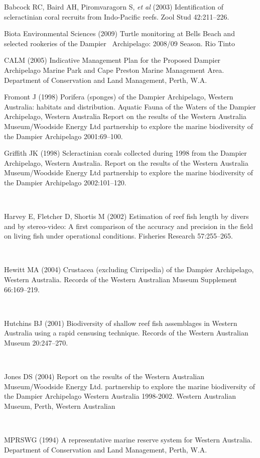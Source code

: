 \documentclass[version=last,
    paper=a4,                               %
    10pt,                                   %
    dvipsnames,
    oneside,                              %
    headings=openany,                       %
    open=any,
    BCOR=7mm,                               %
    DIV=15,     %
]{scrbook}
\begin{document}
Babcock RC, Baird AH, Piromvaragorn S, \emph{et al} (2003)
Identification of scleractinian coral recruits from Indo-Pacific reefs.
Zool Stud 42:211--226.

Biota Environmental Sciences (2009) Turtle monitoring at Bells Beach and
selected rookeries of the Dampier~ Archipelago: 2008/09 Season. Rio
Tinto

CALM (2005) Indicative Management Plan for the Proposed Dampier
Archipelago Marine Park and Cape Preston Marine Management Area.
Department of Conservation and Land Management, Perth, W.A.

Fromont J (1998) Porifera (sponges) of the Dampier Archipelago, Western
Australia: habitats and distribution. Aquatic Fauna of the Waters of the
Dampier Archipelago, Western Australia Report on the results of the
Western Australia Museum/Woodside Energy Ltd partnership to explore the
marine biodiversity of the Dampier Archipelago 2001:69--100.

Griffith JK (1998) Scleractinian corals collected during 1998 from the
Dampier Archipelago, Western Australia. Report on the results of the
Western Australia Museum/Woodside Energy Ltd partnership to explore the
marine biodiversity of the Dampier Archipelago 2002:101--120.

~

Harvey E, Fletcher D, Shortis M (2002) Estimation of reef fish length by
divers and by stereo-video: A first comparison of the accuracy and
precision in the field on living fish under operational conditions.
Fisheries Research 57:255--265.

~

Hewitt MA (2004) Crustacea (excluding Cirripedia) of the Dampier
Archipelago, Western Australia. Records of the Western Australian Museum
Supplement 66:169--219.

~

Hutchins BJ (2001) Biodiversity of shallow reef fish assemblages in
Western Australia using a rapid censusing technique. Records of the
Western Australian Museum 20:247--270.

~

Jones DS (2004) Report on the results of the Western Australian
Museum/Woodside Energy Ltd. partnership to explore the marine
biodiversity of the Dampier Archipelago Western Australia 1998-2002.
Western Australian Museum, Perth, Western Australian

~

MPRSWG (1994) A representative marine reserve system for Western
Australia. Department of Conservation and Land Management, Perth, W.A.
\end{document}
